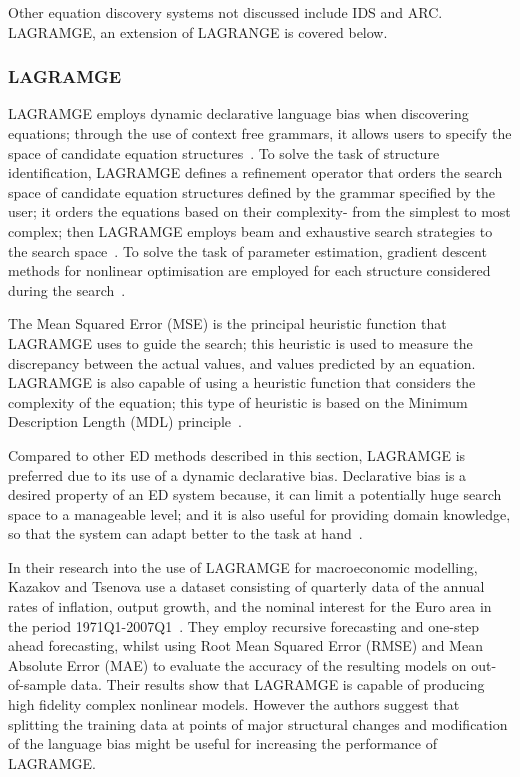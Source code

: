 \documentclass[13pt]{report}
\begin{document}
Other equation discovery systems not discussed include IDS and ARC. LAGRAMGE, an extension of LAGRANGE is covered below.

\subsubsection{LAGRAMGE}
LAGRAMGE employs dynamic declarative language bias when discovering equations; through the use of context free grammars, it allows users to specify the space of candidate equation structures~\cite{equationdiscintro}. To solve the task of structure identification, LAGRAMGE defines a refinement operator that orders the search space of candidate equation structures defined by the grammar specified by the user; it orders the equations based on their complexity- from the simplest to most complex; then LAGRAMGE employs beam and exhaustive search strategies to the search space~\cite{sammut2011encyclopedia}. To solve the task of parameter estimation, gradient descent methods for nonlinear optimisation are employed for each structure considered during the search~\cite{sammut2011encyclopedia}.  

The Mean Squared Error (MSE) is the principal heuristic function that LAGRAMGE uses to guide the search; this heuristic is used to measure the discrepancy between the actual values, and values predicted by an equation. LAGRAMGE is also capable of using a heuristic function that considers the complexity  of the equation; this type of heuristic is based on the Minimum Description Length (MDL) principle~\cite{sammut2011encyclopedia}.

Compared to other ED methods described in this section, LAGRAMGE is preferred due to its use of a dynamic declarative bias. Declarative bias is a desired property of an ED system because, it can limit a potentially huge search space to a manageable level; and it is also useful for providing domain knowledge, so that the system can adapt better to the task at hand~\cite{todorovski1997declarative}.

In their research into the use of LAGRAMGE for macroeconomic modelling, Kazakov and Tsenova use a dataset consisting of quarterly data of the annual rates of inflation, output growth, and the nominal interest for the Euro area in the period 1971Q1-2007Q1~\cite{kazakov2009equation}. They employ recursive forecasting and one-step ahead forecasting, whilst using Root Mean Squared Error (RMSE) and Mean Absolute Error (MAE) to evaluate the accuracy of the resulting models on out-of-sample data. Their results show that LAGRAMGE is capable of producing high fidelity complex nonlinear models. However the authors suggest that splitting the training data at points of major structural changes and modification of the language bias might be useful for increasing the performance of LAGRAMGE. 
\end{document}

